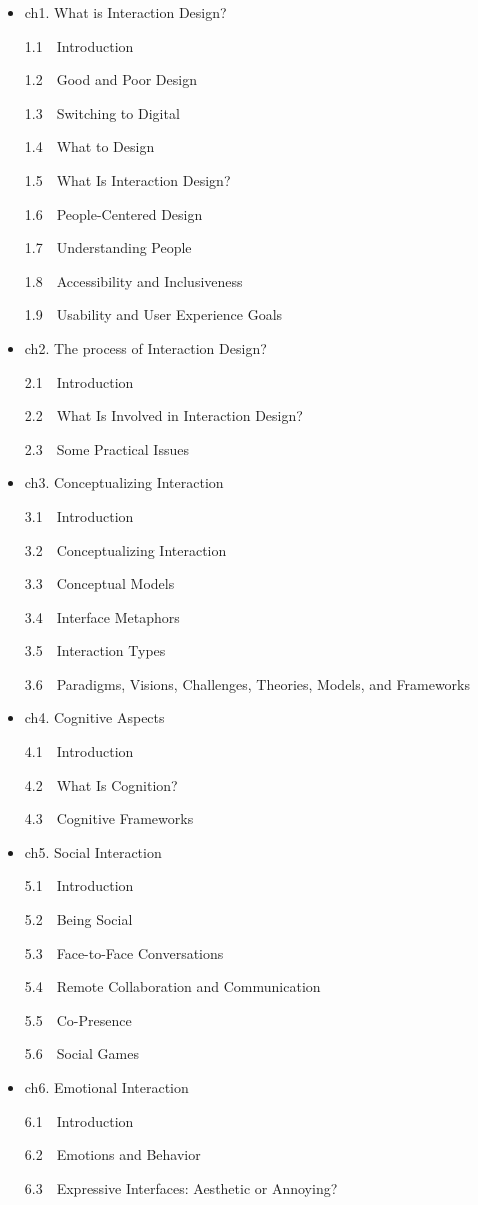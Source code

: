 \documentclass[
  letterpaper,
]{book}
\begin{document}
\begin{itemize}
\item
  ch1. What is Interaction Design?

  1.1 Introduction

  1.2 Good and Poor Design

  1.3 Switching to Digital

  1.4 What to Design

  1.5 What Is Interaction Design?

  1.6 People-Centered Design

  1.7 Understanding People

  1.8 Accessibility and Inclusiveness

  1.9 Usability and User Experience Goals
\item
  ch2. The process of Interaction Design?

  2.1 Introduction

  2.2 What Is Involved in Interaction Design?

  2.3 Some Practical Issues
\item
  ch3. Conceptualizing Interaction

  3.1 Introduction

  3.2 Conceptualizing Interaction

  3.3 Conceptual Models

  3.4 Interface Metaphors

  3.5 Interaction Types

  3.6 Paradigms, Visions, Challenges, Theories, Models, and Frameworks
\item
  ch4. Cognitive Aspects

  4.1 Introduction

  4.2 What Is Cognition?

  4.3 Cognitive Frameworks
\item
  ch5. Social Interaction

  5.1 Introduction

  5.2 Being Social

  5.3 Face-to-Face Conversations

  5.4 Remote Collaboration and Communication

  5.5 Co-Presence

  5.6 Social Games
\item
  ch6. Emotional Interaction

  6.1 Introduction

  6.2 Emotions and Behavior

  6.3 Expressive Interfaces: Aesthetic or Annoying?


\end{itemize}
\end{document}
